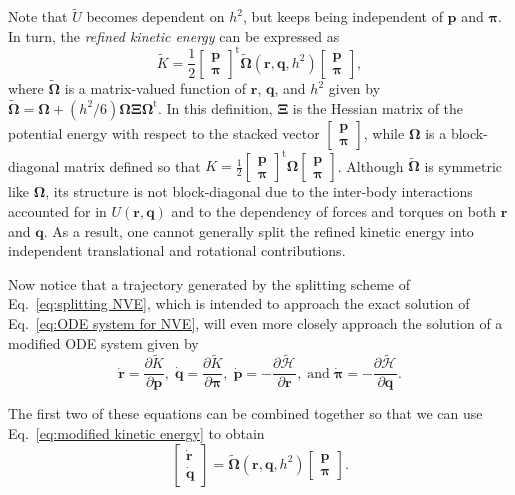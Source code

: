 \documentclass[
journal=jctcce,
layout=twocolumn
]{achemso}
\newcommand{\mt}[1]{\boldsymbol{\mathbf{#1}}}   %
\newcommand{\vt}[1]{\boldsymbol{\mathbf{#1}}}   %
\newcommand{\tr}[1]{#1^\text{t}}                %
\newcommand{\diff}[2]{\frac{\partial #1}{\partial #2}} %
\newcommand{\Ham}[1]{{\mathcal H}_\text{#1}}    %
\newcommand{\timestep}{h}
\newcommand{\refined}[1]{\widetilde{#1}}
\begin{document}
Note that $\refined U$ becomes dependent on $\timestep^2$, but keeps being independent of $\vt p$ and $\vt \pi$.
In turn, the \textit{refined kinetic energy} can be expressed as
\begin{equation}
\label{eq:modified kinetic energy}
\refined K = \frac{1}{2} \tr{\left[\begin{array}{c} \vt p \\ \vt \pi \end{array}\right]} \refined{\mathbf \Omega}(\vt r, \vt q, \timestep^2) \left[\begin{array}{c} \vt p \\ \vt \pi \end{array}\right],
\end{equation}
where $\refined{\mathbf \Omega}$ is a matrix-valued function of $\vt r$, $\vt q$, and $\timestep^2$ given by $\tilde{\mt \Omega} = {\mt \Omega} + ({\timestep^2}/{6}) {\mt \Omega} {\mt \Xi} \tr{\mt \Omega}$.
In this definition, $\mt \Xi$ is the Hessian matrix of the potential energy with respect to the stacked vector $[\substack{\vt p \\ \vt \pi}]$, while ${\mt \Omega}$ is a block-diagonal matrix defined so that $K = \frac{1}{2} \tr{[\substack{\vt p \\ \vt \pi}]} {\mt \Omega} [\substack{\vt p \\ \vt \pi}]$.
Although $\refined{\mathbf \Omega}$ is symmetric like $\mt \Omega$, its structure is not block-diagonal due to the inter-body interactions accounted for in $U(\vt r, \vt q)$ and to the dependency of forces and torques on both $\vt r$ and $\vt q$.
As a result, one cannot generally split the refined kinetic energy into independent translational and rotational contributions.

Now notice that a trajectory generated by the splitting scheme of Eq.~\eqref{eq:splitting NVE}, which is intended to approach the exact solution of Eq.~\eqref{eq:ODE system for NVE}, will even more closely approach the solution of a modified ODE system given by
\begin{equation*}
\dot{\vt r} = \diff{\refined K}{\vt p}, \;
\dot{\vt q} = \diff{\refined K}{\vt \pi}, \;
\dot{\vt p} = -\diff{\refined{\Ham{}}}{\vt r}, \; \text{and} \;
\dot{\vt \pi} = -\diff{\refined{\Ham{}}}{\vt q}.
\end{equation*}

The first two of these equations can be combined together so that we can use Eq.~\eqref{eq:modified kinetic energy} to obtain
\begin{equation}
\label{eq:shadow ODE system}
\left[\begin{array}{c} \dot{\vt r} \\ \dot{\vt q} \end{array}\right] = \refined{\mathbf \Omega}(\vt r, \vt q, \timestep^2) \left[\begin{array}{c} \vt p \\ \vt \pi \end{array}\right].
\end{equation}
\end{document}
